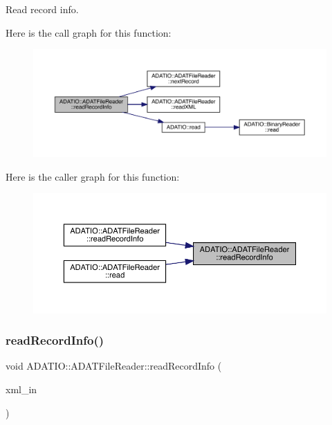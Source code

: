 Read record info. 

Here is the call graph for this function\+:
\nopagebreak
\begin{figure}[H]
\begin{center}
\leavevmode
\includegraphics[width=350pt]{db/de5/group__qio_gade5b9d659e34ec9c9de267858a675d7d_cgraph}
\end{center}
\end{figure}
Here is the caller graph for this function\+:
\nopagebreak
\begin{figure}[H]
\begin{center}
\leavevmode
\includegraphics[width=350pt]{db/de5/group__qio_gade5b9d659e34ec9c9de267858a675d7d_icgraph}
\end{center}
\end{figure}
\mbox{\label{group__qio_ga4d771a46d7db77cd0ae5999113733795}} 
\subsubsection{\texorpdfstring{readRecordInfo()}{readRecordInfo()}\hspace{0.1cm}{\footnotesize\ttfamily [2/2]}}
{\footnotesize\ttfamily void A\+D\+A\+T\+I\+O\+::\+A\+D\+A\+T\+File\+Reader\+::read\+Record\+Info (\begin{DoxyParamCaption}\item[{\mbox{\hyperlink{classADATXML_1_1XMLReader}{X\+M\+L\+Reader}} \&}]{xml\+\_\+in }\end{DoxyParamCaption})\hspace{0.3cm}{\ttfamily [protected]}}



